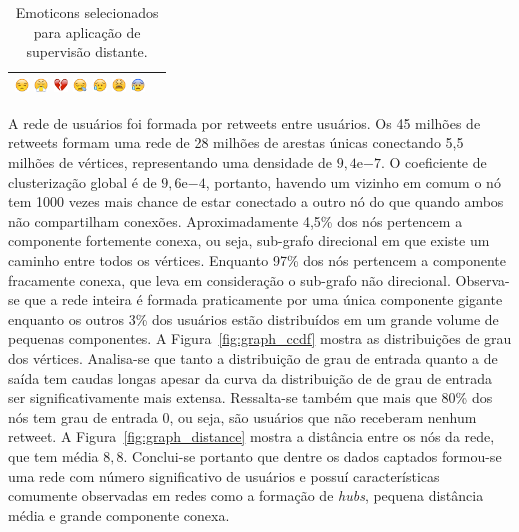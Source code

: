 \begin{table}[h]
\begin{center}
\begin{tabular}{| l | c |}
            \includegraphics[height=1em]{images/emojis/1F612}
            \includegraphics[height=1em]{images/emojis/1F624}
            \includegraphics[height=1em]{images/emojis/1F494}
            \includegraphics[height=1em]{images/emojis/1F62A}
            \includegraphics[height=1em]{images/emojis/1F625}
            \includegraphics[height=1em]{images/emojis/1F62B}
            \includegraphics[height=1em]{images/emojis/1F630}
        \\ \hline
        \end{tabular}
        \caption{Emoticons selecionados para aplicação de supervisão distante.}
        \label{tab:emoticons}
    \end{center}
\end{table}

A rede de usuários foi formada por retweets entre usuários.
Os 45 milhões de retweets formam uma rede de 28 milhões de arestas únicas
conectando 5,5 milhões de vértices, representando uma densidade de
$9,4\mathrm{e}{-7}$.
O coeficiente de clusterização global é de $9,6\mathrm{e}{-4}$, portanto,
havendo um vizinho em comum o nó tem 1000 vezes mais chance de estar conectado a
outro nó do que quando ambos não compartilham conexões.
Aproximadamente 4,5\% dos nós pertencem a componente fortemente conexa, ou seja,
sub-grafo direcional em que existe um caminho entre todos os vértices.
Enquanto 97\% dos nós pertencem a componente fracamente conexa, que leva em
consideração o sub-grafo não direcional.
Observa-se que a rede inteira é formada praticamente por uma única componente
gigante enquanto os outros 3\% dos usuários estão distribuídos em um grande
volume de pequenas componentes.
A Figura~\ref{fig:graph_ccdf} mostra as distribuições de grau dos vértices.
Analisa-se que tanto a distribuição de grau de entrada quanto a de saída tem
caudas longas apesar da curva da distribuição de de grau de entrada ser
significativamente mais extensa.
Ressalta-se também que mais que 80\% dos nós tem grau de entrada 0, ou seja,
são usuários que não receberam nenhum retweet.
A Figura~\ref{fig:graph_distance} mostra a distância entre os nós da rede, que
tem média $8,8$.
Conclui-se portanto que dentre os dados captados formou-se uma rede com número
significativo de usuários e possuí características comumente observadas em redes
como a formação de \textit{hubs}, pequena distância média e grande componente
conexa.

